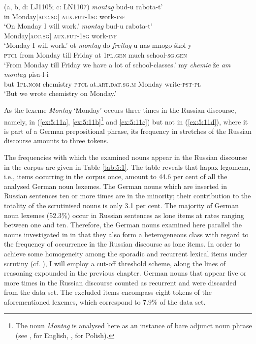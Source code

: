 \ea
\label{ex:5:11}
(a, b, d: LJ1105; c: LN1107)
	\ea 
	 \textit{montag} {bud-u} {rabota-t'}\\
		{in} Monday$[$\textsc{acc.sg}$]$ \textsc{aux.fut-1sg} work-\textsc{inf}\\
			\glt `On Monday I will work.'\label{ex:5:11a}
		\ex
		\gll \textit{montag} {bud-u} {rabota-t'}\\
			{Monday$[$\textsc{acc.sg}$]$} \textsc{aux.fut-1sg} work-\textsc{inf}\\
			\glt `Monday I will work.'\label{ex:5:11b}
		\ex
		 {ot} \textit{montag} {do} \textit{freitag} {u} {nas} {mnogo} {škol-y}\\
			{\textsc{ptcl}} from Monday till Friday at \textsc{1pl.gen} much school-\textsc{sg.gen}\\
			\glt `From Monday till Friday we have a lot of school-classes.'\label{ex:5:11c}
		\ex
		 {my} \textit{chemie} {že} \textit{am} \textit{montag} {pisa-l-i}\\
			{but} \textsc{1pl.nom} chemistry \textsc{ptcl} at.\textsc{art.dat.sg.m} Monday write-\textsc{pst-pl}\\ 
			\glt `But we wrote chemistry on Monday.'		\label{ex:5:11d}
		\z
\z

\noindent 
As the lexeme \textit{Montag} `Monday' occurs three times in the Russian discourse, namely, in (\ref{ex:5:11a}, \ref{ex:5:11b}\footnote{The noun \textit{Montag} is analysed here as an instance of bare adjunct noun phrase (see \citealt{larson85}, for English, \citealt{tajsner}, for Polish).} 
and \ref{ex:5:11c}) but not in (\ref{ex:5:11d}), where it is part of a German prepositional phrase, its frequency in stretches of the Russian discourse amounts to three tokens.

The frequencies with which the examined nouns appear in the Russian discourse in the corpus are given in Table \ref{tab:5:1}. The table reveals that hapax legomena, i.e., items occurring in the corpus once, amount to 44.6 per cent of all the analysed German noun lexemes. The German nouns which are inserted in Russian sentences ten or more times are in the minority; their contribution to the totality of the scrutinised nouns is only 3.1 per cent. The majority of German noun lexemes (52.3\%) occur in Russian sentences as lone items at rates ranging between one and ten. 
Therefore, the German nouns examined here parallel the nouns investigated in  in that they also form a heterogeneous class with regard to the frequency of occurrence in the Russian discourse as lone items. In order to achieve some homogeneity among the sporadic and recurrent lexical items under scrutiny (cf. \citealt{poplack-etal-1988}), I will employ a cut-off threshold scheme, along the lines of reasoning expounded in the previous chapter. German nouns that appear five or more times in the Russian discourse counted as recurrent and were discarded from the data set. The excluded items encompass eight tokens of the aforementioned lexemes, which correspond to 7.9\% of the data set.

